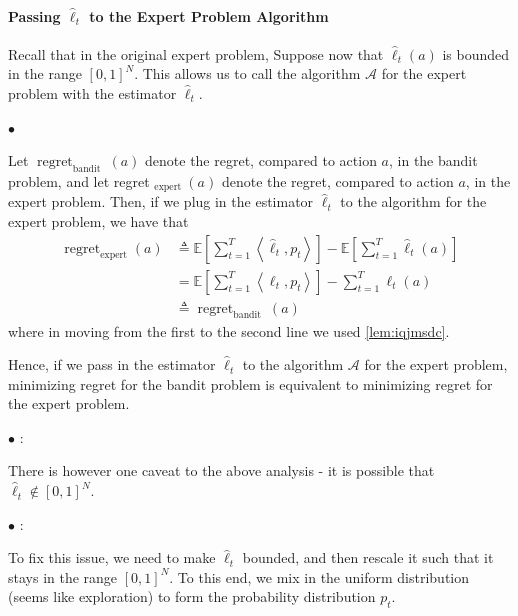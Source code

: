 \documentclass{article}
\newcommand{\re}{\operatorname{regret}}
\begin{document}
\paragraph{Passing $\hat{\ell}_{t}$ to the Expert Problem Algorithm}
Recall that in the original expert problem,  Suppose now that $\hat{\ell}_{t}(a)$ is bounded in the range $[0,1]^{N}$. This allows us to call the algorithm $\mathcal{A}$ for the expert problem with the estimator $\hat{\ell}_{t}$.

$\bullet$ 

Let  $\re_{\text{bandit }}(a)$ denote the regret, compared to action $a$, in the bandit problem, and let regret $_{\text {expert }}(a)$ denote the regret, compared to action $a$, in the expert problem. Then, if we plug in the estimator $\hat{\ell}_{t}$ to the algorithm for the expert problem, we have that
$$
\begin{aligned}
\operatorname{regret}_{\operatorname{expert}}(a) & \triangleq \mathbb{E}\left[\sum_{t=1}^{T}\left\langle\hat{\ell}_{t}, p_{t}\right\rangle\right]-\mathbb{E}\left[\sum_{t=1}^{T} \hat{\ell}_{t}(a)\right] \\
&=\mathbb{E}\left[\sum_{t=1}^{T}\left\langle\ell_{t}, p_{t}\right\rangle\right]-\sum_{t=1}^{T} \ell_{t}(a) \\
& \triangleq \operatorname{regret}_{\text {bandit }}(a)
\end{aligned}
$$
where in moving from the first to the second line we used \cref{lem:iqjmsdc}.

Hence, if we pass in the estimator $\hat{\ell}_{t}$ to the algorithm $\mathcal{A}$ for the expert problem, minimizing regret for the bandit problem is equivalent to minimizing regret for the expert problem.

$\bullet$ : 

There is however one caveat to the above analysis - it is possible that $\hat{\ell}_{t} \notin[0,1]^{N}$.


$\bullet$ : 

To fix this issue, we need to make $\hat{\ell}_{t}$ bounded, and then rescale it such that it stays in the range $[0,1]^{N}$. To this end, we mix in the uniform distribution (seems like exploration) to form the probability distribution $p_{t}$.
\end{document}
